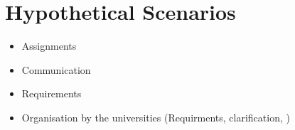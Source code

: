 
\section{Hypothetical Scenarios}

	\begin{itemize}
		\item Assignments
		\item Communication
		\item Requirements
		\item Organisation by the universities (Requirments, clarification, )
	\end{itemize}
